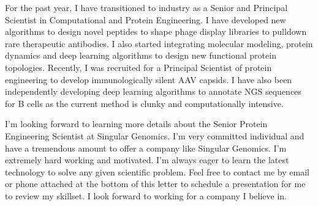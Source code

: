 \documentclass[11pt,a4paper,sans]{moderncv}        %
\begin{document}
For the past year, I have transitioned to industry as a Senior and Principal Scientist in Computational and Protein Engineering. I have developed new algorithms to design novel peptides to shape phage display libraries to pulldown rare therapeutic antibodies. I also started integrating molecular modeling, protein dynamics and deep learning algorithms to design new functional protein topologies. Recently, I was recruited for a Principal Scientist of protein engineering to develop immunologically silent AAV capsids. I have also been independently developing deep learning algorithms to annotate NGS sequences for B cells as the current method is clunky and computationally intensive.

I'm looking forward to learning more details about the Senior Protein Engineering Scientist at Singular Genomics. I'm very committed individual and have a tremendous amount to offer a company like Singular Genomics. I'm extremely hard working and motivated. I'm always eager to learn the latest technology to solve any given scientific problem. Feel free to contact me by email or phone attached at the bottom of this letter to schedule a presentation for me to review my skillset. I look forward to working for a company I believe in. 

\makeletterclosing
\end{document}
